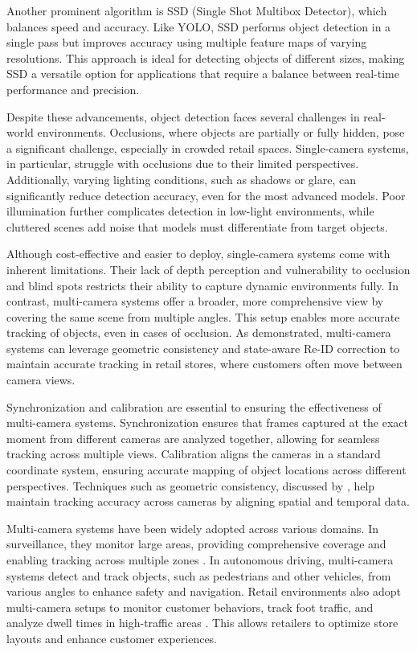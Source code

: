 {Another prominent algorithm is SSD (Single Shot Multibox Detector), which balances speed and accuracy. Like YOLO, SSD performs object detection in a single pass but improves accuracy using multiple feature maps of varying resolutions. This approach is ideal for detecting objects of different sizes, making SSD a versatile option for applications that require a balance between real-time performance and precision.

Despite these advancements, object detection faces several challenges in real-world environments. Occlusions, where objects are partially or fully hidden, pose a significant challenge, especially in crowded retail spaces. Single-camera systems, in particular, struggle with occlusions due to their limited perspectives. Additionally, varying lighting conditions, such as shadows or glare, can significantly reduce detection accuracy, even for the most advanced models. Poor illumination further complicates detection in low-light environments, while cluttered scenes add noise that models must differentiate from target objects.

Although cost-effective and easier to deploy, single-camera systems come with inherent limitations. Their lack of depth perception and vulnerability to occlusion and blind spots restricts their ability to capture dynamic environments fully. In contrast, multi-camera systems offer a broader, more comprehensive view by covering the same scene from multiple angles. This setup enables more accurate tracking of objects, even in cases of occlusion. As \cite{Xie2024} demonstrated, multi-camera systems can leverage geometric consistency and state-aware Re-ID correction to maintain accurate tracking in retail stores, where customers often move between camera views.

Synchronization and calibration are essential to ensuring the effectiveness of multi-camera systems. Synchronization ensures that frames captured at the exact moment from different cameras are analyzed together, allowing for seamless tracking across multiple views. Calibration aligns the cameras in a standard coordinate system, ensuring accurate mapping of object locations across different perspectives. Techniques such as geometric consistency, discussed by \cite{Li2023}, help maintain tracking accuracy across cameras by aligning spatial and temporal data.

Multi-camera systems have been widely adopted across various domains. In surveillance, they monitor large areas, providing comprehensive coverage and enabling tracking across multiple zones \citep{Xie2024}. In autonomous driving, multi-camera systems detect and track objects, such as pedestrians and other vehicles, from various angles to enhance safety and navigation. Retail environments also adopt multi-camera setups to monitor customer behaviors, track foot traffic, and analyze dwell times in high-traffic areas \citep{Cabahug2023}. This allows retailers to optimize store layouts and enhance customer experiences.

}

